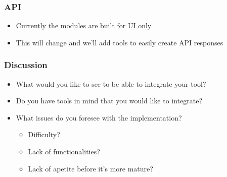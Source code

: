 \begin{frame}
	\frametitle{API}
	\begin{itemize}
		\item Currently the modules are built for UI only
                \item This will change and we'll add tools to easily create API responses
	\end{itemize}
\end{frame}

\begin{frame}
	\frametitle{Discussion}
	\begin{itemize}
		\item What would you like to see to be able to integrate your tool?
                \item Do you have tools in mind that you would like to integrate?
                \item What issues do you foresee with the implementation?
                	\begin{itemize}
		                \item Difficulty?
		                \item Lack of functionalities?
		                \item Lack of apetite before it's more mature?
                	\end{itemize}
	\end{itemize}
\end{frame}


